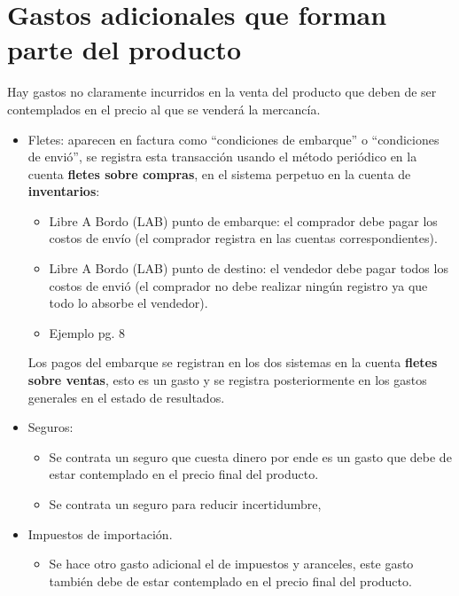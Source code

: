 \documentclass{article}
\begin{document}

\section{Gastos adicionales que forman parte del producto}
Hay gastos no claramente incurridos en la venta del producto que deben de ser contemplados en el precio al que se venderá la mercancía.
\begin{itemize}
    \item Fletes: aparecen en factura como ``condiciones de embarque'' o  ``condiciones de envió'', se registra esta transacción usando el método periódico en la cuenta \textbf{fletes sobre compras}, en el sistema perpetuo en la cuenta de \textbf{inventarios}:
    \begin{itemize}
        \item Libre A Bordo (LAB) punto de embarque: el comprador debe pagar los costos de envío (el comprador registra en las cuentas correspondientes).
        \item Libre A Bordo (LAB) punto de destino: el vendedor debe pagar todos los costos de envió (el comprador no debe realizar ningún registro ya que todo lo absorbe el vendedor).
        \item Ejemplo pg. 8
    \end{itemize} 
    Los pagos del embarque se registran en los dos sistemas en la cuenta \textbf{fletes sobre ventas}, esto es un gasto y se registra posteriormente en los gastos generales en el estado de resultados.


    
    \item Seguros:
    \begin{itemize}
        \item Se contrata un seguro que cuesta dinero por ende es un gasto que debe de estar contemplado en el precio final del producto.
        \item Se contrata un seguro para reducir incertidumbre,
    \end{itemize}

    
    \item Impuestos de importación.
    \begin{itemize}
        \item Se hace otro gasto adicional el de impuestos y aranceles, este gasto también debe de estar contemplado en el precio final del producto.
    \end{itemize}
\end{itemize}
\end{document}
